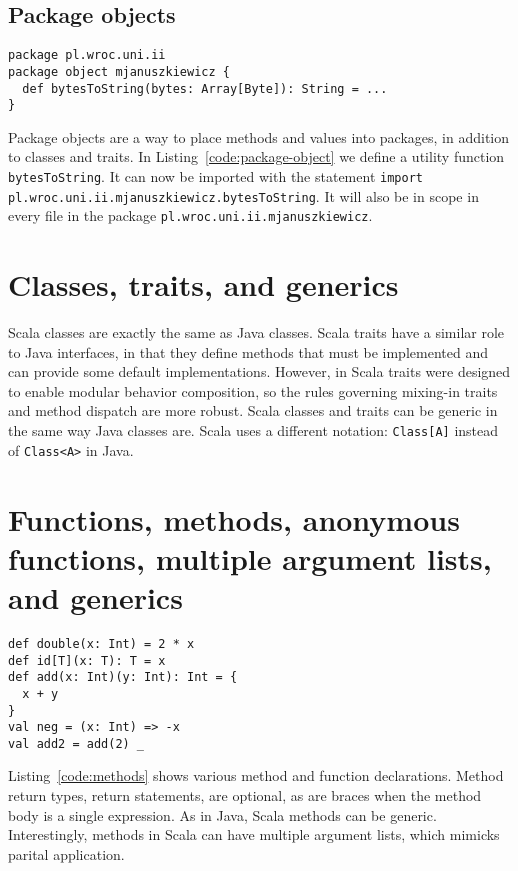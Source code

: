 \subsection{Package objects}

\begin{lstlisting}[caption=Package object, label=code:package-object, escapechar=|, float, floatplacement=H]
package pl.wroc.uni.ii
package object mjanuszkiewicz {
  def bytesToString(bytes: Array[Byte]): String = ...
}
\end{lstlisting}

Package objects are a way to place methods and values into packages, in addition to classes and traits.
In Listing~\ref{code:package-object} we define a utility function \texttt{bytesToString}.
It can now be imported with the statement \texttt{import pl.wroc.uni.ii.mjanuszkiewicz.bytesToString}.
It will also be in scope in every file in the package \texttt{pl.wroc.uni.ii.mjanuszkiewicz}.

\section{Classes, traits, and generics}

Scala classes are exactly the same as Java classes.
Scala traits have a similar role to Java interfaces, in that they define methods that must be implemented and can provide some default implementations.
However, in Scala traits were designed to enable modular behavior composition, so the rules governing mixing-in traits and method dispatch are more robust.
Scala classes and traits can be generic in the same way Java classes are.
Scala uses a different notation: \texttt{Class[A]} instead of \texttt{Class<A>} in Java.

\section{Functions, methods, anonymous functions, multiple argument lists, and generics}

\begin{lstlisting}[caption=Methods and functions, label=code:methods, escapechar=|, float, floatplacement=H]
def double(x: Int) = 2 * x
def id[T](x: T): T = x
def add(x: Int)(y: Int): Int = {
  x + y
}
val neg = (x: Int) => -x
val add2 = add(2) _
\end{lstlisting}

Listing~\ref{code:methods} shows various method and function declarations.
Method return types, return statements, are optional, as are braces when the method body is a single expression.
As in Java, Scala methods can be generic.
Interestingly, methods in Scala can have multiple argument lists, which mimicks parital application.

